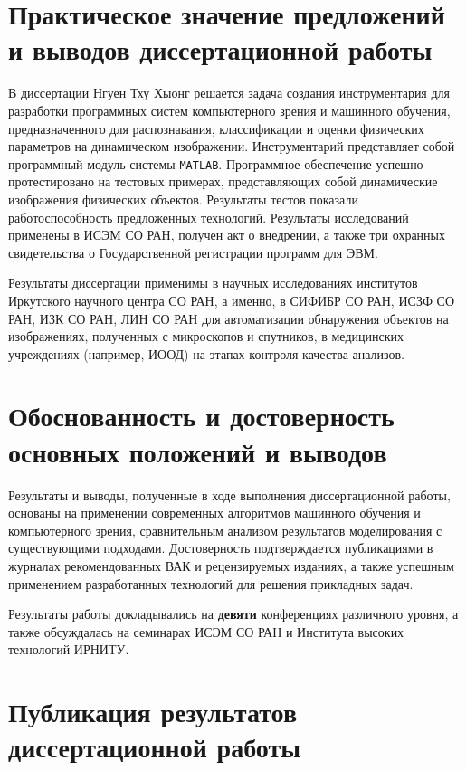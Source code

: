 \documentclass[12pt]{extarticle}
\begin{document}
\section{Практическое значение предложений и выводов диссертационной работы}
\label{sec:prec-val}

В диссертации Нгуен Тху Хыонг решается задача создания инструментария для разработки программных систем компьютерного зрения и машинного обучения, предназначенного для распознавания, классификации и оценки физических параметров на динамическом изображении.  Инструментарий представляет собой %
программный модуль системы \texttt{MATLAB}.  Программное обеспечение успешно протестировано на тестовых примерах, представляющих собой динамические изображения физических объектов.  Результаты тестов показали работоспособность предложенных технологий.   Результаты исследований применены в ИСЭМ СО РАН, получен акт о внедрении, а также три охранных свидетельства о Государственной регистрации программ для ЭВМ.

Результаты диссертации применимы в научных исследованиях институтов Иркутского научного центра СО РАН, а именно, в СИФИБР СО РАН, ИСЗФ СО РАН, ИЗК СО РАН, ЛИН СО РАН для автоматизации обнаружения объектов на изображениях, полученных с микроскопов и спутников, в медицинских учреждениях (например, ИООД) на этапах контроля качества анализов.

\section{Обоснованность и достоверность основных положений и выводов}
\label{sec:verification}

Результаты и выводы, полученные в ходе выполнения диссертационной работы, основаны на применении современных алгоритмов машинного обучения и компьютерного зрения, сравнительным анализом результатов моделирования с существующими подходами.  Достоверность подтверждается публикациями в журналах рекомендованных ВАК и рецензируемых изданиях, а также успешным применением разработанных технологий для решения прикладных задач.

Результаты работы докладывались на \textbf{девяти} конференциях различного уровня, а также обсуждалась на семинарах ИСЭМ СО РАН и Института высоких технологий ИРНИТУ.

\section{Публикация результатов диссертационной работы}
\label{sec:publ}
\end{document}
